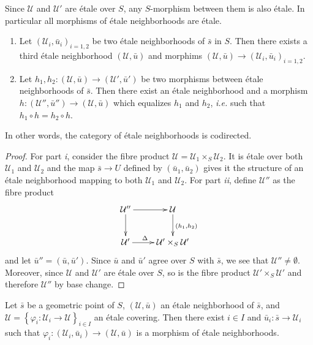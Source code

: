 \begin{remark}
\label{remark-etale-between-etale}
Since $\mathcal{U}$ and $\mathcal{U}'$ are \'etale over $S$, any $S$-morphism
between them is also \'etale. In particular all morphisms of \'etale
neighborhoods are \'etale.
\end{remark}

\begin{lemma}
\label{lemma-cofinal-etale}
\begin{enumerate}
\item Let $(\mathcal{U}_i, \bar u_i)_{i=1, 2}$ be two \'etale neighborhoods of
$\bar s$ in $S$. Then there exists a third \'etale neighborhood $(\mathcal{U},
\bar u)$ and morphims $(\mathcal{U}, \bar u) \to (\mathcal{U}_i, \bar
u_i)_{i=1,2}$.
\item Let $h_1, h_2: (\mathcal{U}, \bar u) \to (\mathcal{U}', \bar u')$ be two
morphisms between \'etale neighborhoods of $\bar s$. Then there exist an
\'etale neighborhood and a morphism $h : (\mathcal{U}'', \bar u'')\to
(\mathcal{U}, \bar u)$ which equalizes $h_1$ and $h_2$, {\it i.e.} such that
$h_1\circ h = h_2\circ h$.		
\end{enumerate}
\end{lemma}

\noindent
In other words, the category of \'etale neighborhoods is codirected.

\begin{proof}
For part {\it i}, consider the fibre product $\mathcal{U} = \mathcal{U}_1
\times_S \mathcal{U}_2$. It is \'etale over both $\mathcal{U}_1$ and
$\mathcal{U}_2$ and the map $\bar s \to U$ defined by $(\bar u_1, \bar u_2)$
gives it the structure of an \'etale neighborhood mapping to both
$\mathcal{U}_1$ and $\mathcal{U}_2$. For part {\it ii}, define $\mathcal{U}''$
as the fibre product
$$
\xymatrix{
{\mathcal{U}''} \ar[r] \ar[d] & {\mathcal{U}} \ar^{(h_1,h_2)}[d] \\
{\mathcal{U}'} \ar^{\Delta \quad}[r] & {\mathcal{U}' \times_S \mathcal{U}'}
}
$$
and let $\bar u'' = (\bar u, \bar u')$. Since $\bar u$ and $\bar u'$ agree over
$S$ with $\bar s$, we see that $\mathcal{U}''\neq\emptyset$. Moreover, since
$\mathcal{U}$ and $\mathcal{U}'$ are \'etale over $S$, so is the fibre product
$\mathcal{U}'\times_S \mathcal{U}'$ and therefore $\mathcal{U}''$ by base
change.
\end{proof}

\begin{lemma}
\label{lemma-geometric-lift-to-cover}
Let $\bar s$ be a geometric point of $S$, $(\mathcal{U}, \bar u)$ an \'etale
neighborhood of $\bar s$, and $\mathcal{U} = \left\{\varphi_i : \mathcal{U}_i
\to \mathcal{U} \right\}_{i\in I}$ an \'etale covering. Then there exist $i\in
I$ and $\bar u_i: \bar s \to \mathcal{U}_i$ such that $\varphi_i:
(\mathcal{U}_i, \bar u_i) \to (\mathcal{U}, \bar u)$ is a morphism of \'etale
neighborhoods.
\end{lemma}

